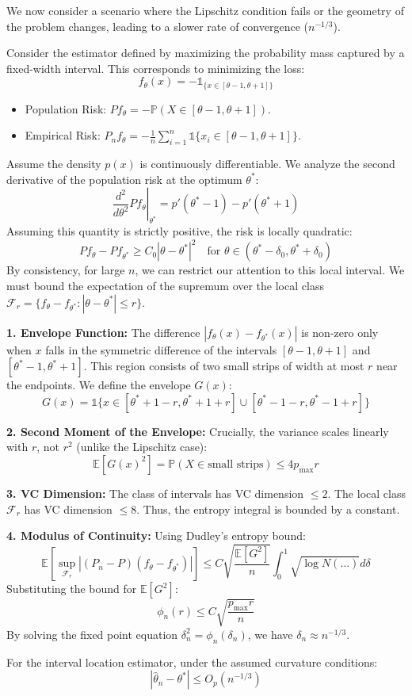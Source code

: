 \begin{eg}
    We now consider a scenario where the Lipschitz condition fails or the geometry of the problem changes, leading to a slower rate of convergence ($n^{-1/3}$).

Consider the estimator defined by maximizing the probability mass captured by a fixed-width interval. This corresponds to minimizing the loss:
$$
f_\theta(x) = - \mathbb{1}_{\{x \in [\theta - 1, \theta + 1]\}}
$$
\begin{itemize}
    \item Population Risk: $P f_\theta = - \mathbb{P}(X \in [\theta-1, \theta+1])$.
    \item Empirical Risk: $P_n f_\theta = - \frac{1}{n} \sum_{i=1}^n \mathbb{1}\{x_i \in [\theta-1, \theta+1]\}$.
\end{itemize}

Assume the density $p(x)$ is continuously differentiable. We analyze the second derivative of the population risk at the optimum $\theta^*$:
$$
\left. \frac{d^2}{d\theta^2} P f_\theta \right|_{\theta^*} = p'(\theta^* - 1) - p'(\theta^* + 1)
$$
Assuming this quantity is strictly positive, the risk is locally quadratic:
$$
P f_\theta - P f_{\theta^*} \ge C_0 |\theta - \theta^*|^2 \quad \text{for } \theta \in (\theta^* - \delta_0, \theta^* + \delta_0)
$$
By consistency, for large $n$, we can restrict our attention to this local interval. We must bound the expectation of the supremum over the local class $\mathcal{F}_r = \{f_\theta - f_{\theta^*} : |\theta - \theta^*| \le r\}$.

\textbf{1. Envelope Function:}
The difference $|f_\theta(x) - f_{\theta^*}(x)|$ is non-zero only when $x$ falls in the symmetric difference of the intervals $[\theta-1, \theta+1]$ and $[\theta^*-1, \theta^*+1]$. This region consists of two small strips of width at most $r$ near the endpoints.
We define the envelope $G(x)$:
$$
G(x) = \mathbb{1}\{x \in [\theta^*+1-r, \theta^*+1+r] \cup [\theta^*-1-r, \theta^*-1+r]\}
$$

\textbf{2. Second Moment of the Envelope:}
Crucially, the variance scales linearly with $r$, not $r^2$ (unlike the Lipschitz case):
$$
\mathbb{E}[G(x)^2] = \mathbb{P}(X \in \text{small strips}) \le 4 p_{\max} r
$$

\textbf{3. VC Dimension:}
The class of intervals has VC dimension $\le 2$. The local class $\mathcal{F}_r$ has VC dimension $\le 8$. Thus, the entropy integral is bounded by a constant.

\textbf{4. Modulus of Continuity:}
Using Dudley's entropy bound:
$$
\mathbb{E}\left[ \sup_{\mathcal{F}_r} |(P_n - P)(f_\theta - f_{\theta^*})| \right] \le C \sqrt{\frac{\mathbb{E}[G^2]}{n}} \int_0^1 \sqrt{\log N(\dots)} d\delta
$$
Substituting the bound for $\mathbb{E}[G^2]$:
$$
\phi_n(r) \le C \sqrt{\frac{p_{\max} r}{n}}
$$
By solving the fixed point equation $\delta_n^2 = \phi_n(\delta_n)$, we have $\delta_n \approx n^{-1/3}$.
\begin{thm}
For the interval location estimator, under the assumed curvature conditions:
$$
|\hat{\theta}_n - \theta^*| \le O_p\left( n^{-1/3} \right)
$$
\end{thm}
\end{eg}


